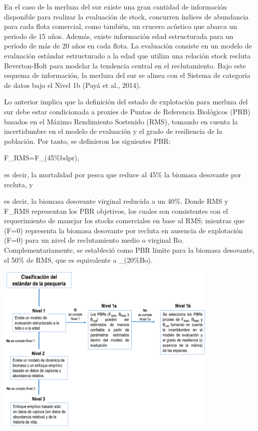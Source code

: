 \documentclass[
  spanish,
]{article}
\begin{document}
En el caso de la merluza del sur existe una gran cantidad de información
disponible para realizar la evaluación de stock, concurren índices de
abundancia para cada flota comercial, como también, un crucero acústico
que abarca un periodo de 15 años. Además, existe información edad
estructurada para un período de más de 20 años en cada flota. La
evaluación consiste en un modelo de evaluación estándar estructurado a
la edad que utiliza una relación stock recluta Beverton-Holt para
modelar la tendencia central en el reclutamiento. Bajo este esquema de
información, la merluza del sur se alinea con el Sistema de categoría de
datos bajo el Nivel 1b (Payá et al., 2014).

Lo anterior implica que la definición del estado de explotación para
merluza del sur debe estar condicionada a proxies de Puntos de
Referencia Biológicos (PRB) basados en el Máximo Rendimiento Sostenido
(RMS), tomando en cuenta la incertidumbre en el modelo de evaluación y
el grado de resiliencia de la población. Por tanto, se definieron los
siguientes PBR:

F\_RMS=F\_(45\%bdpr),

es decir, la mortalidad por pesca que reduce al 45\% la biomasa
desovante por recluta, y

es decir, la biomasa desovante virginal reducida a un 40\%. Donde RMS y
F\_RMS representan los PBR objetivos, los cuales son consistentes con el
requerimiento de manejar los stocks comerciales en base al RMS; mientras
que (F=0) representa la biomasa desovante por recluta en ausencia de
explotación (F=0) para un nivel de reclutamiento medio o virginal Ro.
Complementariamente, se estableció como PBR límite para la biomasa
desovante, el 50\% de RMS, que es equivalente a \_(20\%Bo).

\begin{center}
\includegraphics[width=0.8\textwidth]{Figuras/Figura_1.png}
\end{center}
\end{document}
